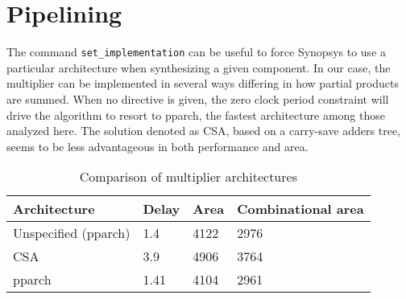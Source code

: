 \section{Pipelining}
The command \texttt{set\_implementation} can be useful to force Synopsys to use a particular architecture when synthesizing a given component. In our case, the multiplier can be implemented in several ways differing in how partial products are summed. When no directive is given, the zero clock period constraint will drive the algorithm to resort to pparch, the fastest architecture among those analyzed here. The solution denoted as CSA, based on a carry-save adders tree, seems to be less advantageous in both performance and area. 
\begin{table}[h]
	\centering
	\begin{tabular}{|l|l|l|l|}\hline
		Architecture & Delay & Area & Combinational area \\\hline
		Unspecified (pparch) & 1.4 & 4122 & 2976 \\\hline
		CSA & 3.9 & 4906 & 3764 \\\hline
		pparch & 1.41 & 4104 & 2961 \\\hline
	\end{tabular}
\caption{Comparison of multiplier architectures}
\end{table}